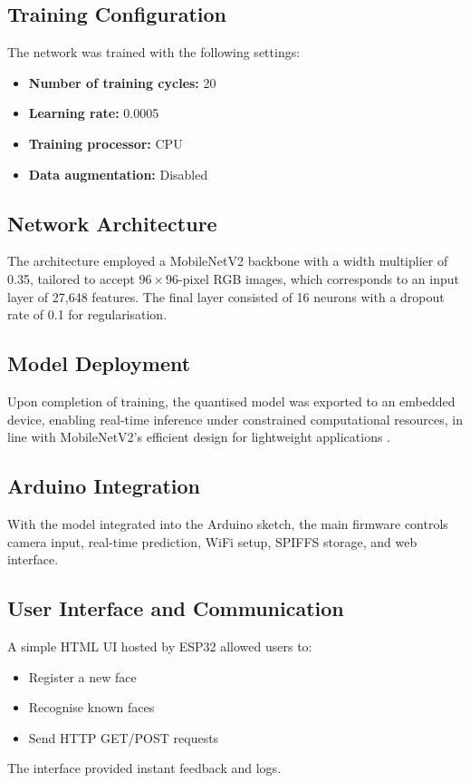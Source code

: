 \subsection{Training Configuration}
The network was trained with the following settings:
\begin{itemize}
    \item \textbf{Number of training cycles:} 20
    \item \textbf{Learning rate:} 0.0005
    \item \textbf{Training processor:} CPU
    \item \textbf{Data augmentation:} Disabled
\end{itemize}

\subsection{Network Architecture}
The architecture employed a MobileNetV2 backbone with a width multiplier of 0.35, tailored to accept $96 \times 96$-pixel RGB images, which corresponds to an input layer of 27,648 features. The final layer consisted of 16 neurons with a dropout rate of 0.1 for regularisation.

\subsection{Model Deployment}
Upon completion of training, the quantised model was exported to an embedded device, enabling real-time inference under constrained computational resources, in line with MobileNetV2's efficient design for lightweight applications \cite{Sandler:2018}.
\newpage

\subsection{Arduino Integration}
With the model integrated into the Arduino sketch, the main firmware controls camera input, real-time prediction, WiFi setup, SPIFFS storage, and web interface.

\subsection{User Interface and Communication}
A simple HTML UI hosted by ESP32 allowed users to:
\begin{itemize}
    \item Register a new face
    \item Recognise known faces
    \item Send HTTP GET/POST requests
\end{itemize}
The interface provided instant feedback and logs.
\newpage


